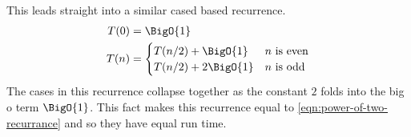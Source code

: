 \documentclass[./Thesis.tex]{subfiles}
\begin{document}
This leads straight into a similar cased based recurrence.
\begin{align}
  \label{eqn:squaring-recurrance}
  \begin{split}
    T(0) &= \BigO{1} \\
    T(n) &=
    \begin{cases}
      T(n / 2) + \BigO{1} & n \text{ is even} \\
      T(n / 2) + 2 \BigO{1} & n \text{ is odd} \\
  \end{cases}
  \end{split}
\end{align}
The cases in this recurrence collapse together as the constant $2$ folds into
the big o term $\BigO{1}$. This fact makes this recurrence equal to
\ref{eqn:power-of-two-recurrance} and so they have equal run time.
\end{document}
